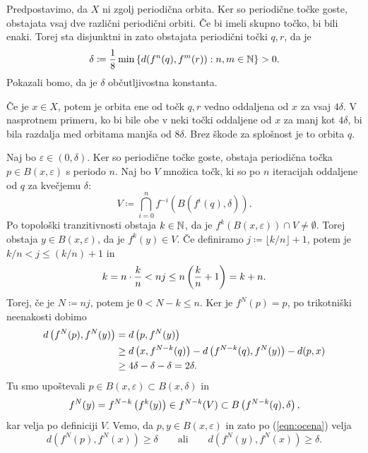 \begin{dokaz}
    Predpostavimo, da \(X\) ni zgolj periodična orbita. Ker so periodične točke goste, obstajata vsaj dve različni periodični orbiti. Če bi imeli skupno točko, bi bili enaki. Torej sta disjunktni in zato obstajata periodični točki \(q, r\), da je
    \[\delta \coloneq \frac{1}{8} \min \left\{ d (f^n (q), f^m (r)) : n, m \in \mathbb N \right\} > 0.\] Pokazali bomo, da je \(\delta\) občutljivostna konstanta.

    Če je \(x \in X\), potem je orbita ene od točk \(q, r\) vedno oddaljena od \(x\) za vsaj \(4 \delta\). V nasprotnem primeru, ko bi bile obe v neki točki oddaljene od \(x\) za manj kot \(4 \delta\), bi bila razdalja med orbitama manjša od \(8 \delta\). Brez škode za splošnost je to orbita \(q\).

    Naj bo \(\varepsilon \in (0, \delta)\). Ker so periodične točke goste, obstaja periodična točka \(p \in B (x, \varepsilon)\) s periodo \(n\). Naj bo \(V\) množica točk, ki so po \(n\) iteracijah oddaljene od \(q\) za kvečjemu \(\delta\):
    \[V \coloneq \bigcap_{i = 0}^n f^{- i} (B (f^i (q), \delta)).\]
    Po topološki tranzitivnosti obstaja \(k \in \mathbb N\), da je \(f^k (B (x, \varepsilon)) \cap V \neq \emptyset\). Torej obstaja \(y \in B (x, \varepsilon)\), da je \(f^k (y) \in V\). Če definiramo \(j \coloneq \lfloor k / n \rfloor + 1\), potem je \(k / n < j \leq (k / n) + 1\) in
    \[k = n \cdot \frac{k}{n} < n j \leq n \left( \frac{k}{n} + 1 \right) = k + n.\]
    Torej, če je \(N \coloneq n j\), potem je \(0 < N - k \leq n\). Ker je \(f^N (p) = p\), po trikotniški neenakosti dobimo
    \begin{align}
        d \left( f^N (p), f^N (y) \right) & = d \left( p, f^N (y) \right) \nonumber                                                              \\
                                 & \geq d \left( x, f^{N - k} (q) \right) - d \left( f^{N - k} (q), f^N (y) \right) - d (p, x) \label{eqn:ocena} \\
                                 & \geq 4 \delta - \delta - \delta = 2 \delta. \nonumber
    \end{align}
    Tu smo upoštevali \(p \in B (x, \varepsilon) \subset B (x, \delta)\) in
    \[f^N (y) = f^{N - k} \left( f^k (y) \right) \in f^{N - k} (V) \subset B \left( f^{N - k} (q), \delta \right),\]
    kar velja po definiciji \(V\). Vemo, da \(p, y \in B (x, \varepsilon)\) in zato po (\ref{eqn:ocena}) velja
    \[d (f^N (p), f^N (x)) \geq \delta \qquad \text{ali} \qquad d (f^N (y), f^N (x)) \geq \delta.\]
\end{dokaz}

